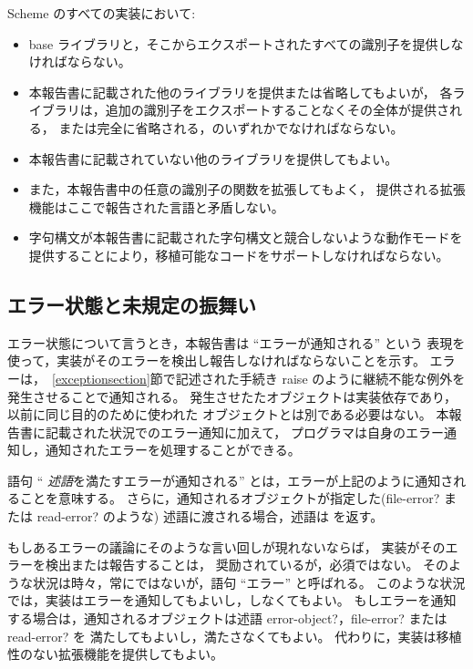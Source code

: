 Scheme のすべての実装において:
\begin{itemize}

\item base ライブラリと，そこからエクスポートされたすべての識別子を提供しなければならない。

\item 本報告書に記載された他のライブラリを提供または省略してもよいが，
各ライブラリは，追加の識別子をエクスポートすることなくその全体が提供される，
または完全に省略される，のいずれかでなければならない。

\item 本報告書に記載されていない他のライブラリを提供してもよい。

\item また，本報告書中の任意の識別子の関数を拡張してもよく，
提供される拡張機能はここで報告された言語と矛盾しない。

\item 字句構文が本報告書に記載された字句構文と競合しないような動作モードを
提供することにより，移植可能なコードをサポートしなければならない。
\end{itemize}

\subsection{エラー状態と未規定の振舞い}
\label{errorsituations}

エラー状態について言うとき，本報告書は ``エラーが通知される'' という
表現を使って，実装がそのエラーを検出し報告しなければならないことを示す。
エラーは，~\ref{exceptionsection}節で記述された手続き {\cf raise}
のように継続不能な例外を発生させることで通知される。
発生させたたオブジェクトは実装依存であり，以前に同じ目的のために使われた
オブジェクトとは別である必要はない。
本報告書に記載された状況でのエラー通知に加えて，
プログラマは自身のエラー通知し，通知されたエラーを処理することができる。

語句 `` {\em 述語}を満たすエラーが通知される'' とは，エラーが上記のように通知されることを意味する。
さらに，通知されるオブジェクトが指定した({\cf file-error?} または {\cf read-error?} のような)
述語に渡される場合，述語は \schtrue{} を返す。

\vest もしあるエラーの議論にそのような言い回しが現れないならば，
実装がそのエラーを検出または報告することは，
奨励されているが，必須ではない。
そのような状況は時々，常にではないが，語句 ``エラー'' と呼ばれる。
このような状況では，実装はエラーを通知してもよいし，しなくてもよい。
もしエラーを通知する場合は，通知されるオブジェクトは述語
{\cf error-object?}，{\cf file-error?} または{\cf read-error?} を
満たしてもよいし，満たさなくてもよい。
代わりに，実装は移植性のない拡張機能を提供してもよい。


